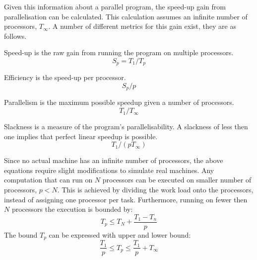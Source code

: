 Given this information about a parallel program, the speed-up gain from parallelisation can be calculated. This calculation assumes an infinite number of processors, $T_\infty$. A number of different metrics for this gain exist, they are as follows.
\begin{labeling}{\quad\quad}
    \item[Speed-up] is the raw gain from running the program on multiple processors.
    \begin{equation*}
        S_p = T_1/T_p
    \end{equation*}
    \item[Efficiency] is the speed-up per processor.
    \begin{equation*}
        S_p/p
    \end{equation*}
    \item[Parallelism] is the maximum possible speedup given a number of processors.
    \begin{equation*}
        T_1/T_\infty
    \end{equation*}
    \item[Slackness] is a measure of the program's parallelisability. A slackness of less then one implies that perfect linear speedup is possible.
    \begin{equation*}
        T_1/(pT_\infty)
    \end{equation*}
\end{labeling}
Since no actual machine has an infinite number of processors, the above equations require slight modifications to simulate real machines. Any computation that can run on $N$ processors can be executed on smaller number of processors, $p < N$\cite{Gustafson2011}. This is achieved by dividing the work load onto the processors, instead of assigning one processor per task. Furthermore, running on fewer then $N$ processors the execution is bounded by:
\begin{equation*}
    T_p \leq T_N + \frac{T_1 - T_n}{p}
\end{equation*}
The bound $T_p$ can be expressed with upper and lower bound\cite{brent1974parallel}:
\begin{equation*}
    \frac{T_1}{p} \leq T_p \leq \frac{T_1}{p} + T_\infty
\end{equation*}
